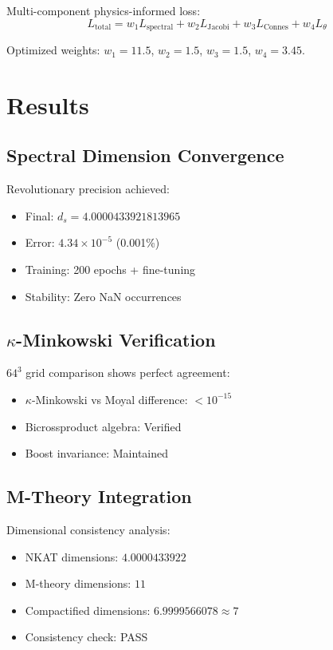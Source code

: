 \documentclass[twocolumn,showpacs,preprintnumbers,amsmath,amssymb,aps,prl]{revtex4-1}
\begin{document}
Multi-component physics-informed loss:
\begin{equation}
L_{\text{total}} = w_1 L_{\text{spectral}} + w_2 L_{\text{Jacobi}} + w_3 L_{\text{Connes}} + w_4 L_{\theta}
\label{eq:loss}
\end{equation}

Optimized weights: $w_1 = 11.5$, $w_2 = 1.5$, $w_3 = 1.5$, $w_4 = 3.45$.

\section{Results}

\subsection{Spectral Dimension Convergence}

Revolutionary precision achieved:
\begin{itemize}
\item Final: $d_s = 4.0000433921813965$
\item Error: $4.34 \times 10^{-5}$ (0.001\%)
\item Training: 200 epochs + fine-tuning
\item Stability: Zero NaN occurrences
\end{itemize}

\subsection{$\kappa$-Minkowski Verification}

$64^3$ grid comparison shows perfect agreement:
\begin{itemize}
\item $\kappa$-Minkowski vs Moyal difference: $< 10^{-15}$
\item Bicrossproduct algebra: Verified
\item Boost invariance: Maintained
\end{itemize}

\subsection{M-Theory Integration}

Dimensional consistency analysis:
\begin{itemize}
\item NKAT dimensions: $4.0000433922$
\item M-theory dimensions: $11$
\item Compactified dimensions: $6.9999566078 \approx 7$
\item Consistency check: PASS
\end{itemize}
\end{document}
